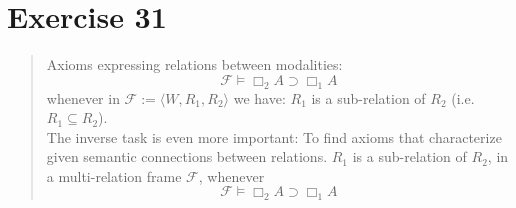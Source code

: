 \documentclass[11pt,a4paper]{article}
\newcommand{\lto}{\supset}
\newcommand{\all}{\Box}
\begin{document}



\section*{Exercise 31}
\begin{quote}
Axioms expressing relations between modalities:
\begin{equation*}
\mathcal{F} \models \all_2 A \lto \all_1 A
\end{equation*}
whenever in $\mathcal{F}:=\langle W, R_1, R_2 \rangle$ we have:
$R_1$ is a sub-relation of $R_2$ (i.e. $R_1 \subseteq R_2$). \\
The inverse task is even more important:
To find axioms that characterize given semantic connections between relations.
$R_1$ is a sub-relation of $R_2$, in a multi-relation frame $\mathcal{F}$, whenever
\begin{equation*}
\mathcal{F} \models \all_2 A \lto \all_1 A
\end{equation*}
\end{quote}
\end{document}
